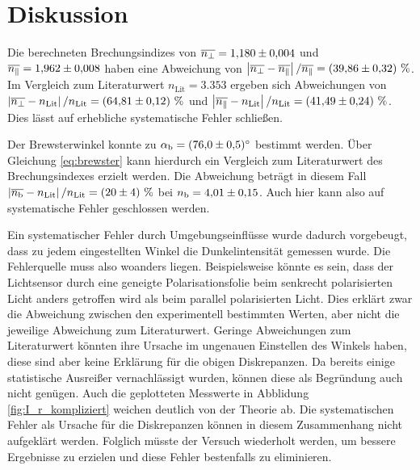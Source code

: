 \section{Diskussion}
Die berechneten Brechungsindizes von $\overline{n_\perp} = \num{1.180 \pm 0.004} $
und $\overline{n_\parallel} = \num{1.962 \pm 0.008}$ haben eine Abweichung von 
$\left|\overline{n_\perp} - \overline{n_\parallel}\right|/\overline{n_\parallel} = \left(\num{39.86 +- 0.32}\right) \, \%$.
Im Vergleich zum Literaturwert \cite{si_n} $n_\text{Lit} = \num{3.353}$ ergeben sich Abweichungen von
$\left|\overline{n_\perp} - n_\text{Lit}\right|/n_\text{Lit} = \left(\num{64.81 +- 0.12}\right) \, \%$
und $\left|\overline{n_\parallel} - n_\text{Lit}\right|/n_\text{Lit} = \left(\num{41.49+-0.24}\right) \, \%$.
Dies lässt auf erhebliche systematische Fehler schließen.

\noindent
Der Brewsterwinkel konnte zu $\alpha_\text{b} = \qty{76 \pm 0.5}{\degree}$ bestimmt werden.
Über Gleichung \eqref{eq:brewster} kann hierdurch ein Vergleich zum Literaturwert des Brechungsindexes erzielt werden.
Die Abweichung beträgt in diesem Fall
$\left|\overline{n_\text{b}} - n_\text{Lit}\right|/n_\text{Lit} = \left(\num{20+-4}\right) \, \%$
bei $n_\text{b} = \num{4.01 \pm 0.15}$.
Auch hier kann also auf systematische Fehler geschlossen werden.

\noindent
Ein systematischer Fehler durch Umgebungseinflüsse wurde dadurch vorgebeugt, dass zu jedem eingestellten Winkel die Dunkelintensität gemessen wurde.
Die Fehlerquelle muss also woanders liegen.
Beispielsweise könnte es sein, dass der Lichtsensor durch eine geneigte Polarisationsfolie beim senkrecht polarisierten Licht anders getroffen wird als beim parallel
polarisierten Licht. 
Dies erklärt zwar die Abweichung zwischen den experimentell bestimmten Werten, aber nicht die jeweilige Abweichung zum Literaturwert.
Geringe Abweichungen zum Literaturwert könnten ihre Ursache im ungenauen Einstellen des Winkels haben, diese sind aber keine Erklärung für die obigen Diskrepanzen.
Da bereits einige statistische Ausreißer vernachlässigt wurden, können diese als Begründung auch nicht genügen.
Auch die geplotteten Messwerte in Abblidung \ref{fig:I_r_kompliziert} weichen deutlich von der Theorie ab.
Die systematischen Fehler als Ursache für die Diskrepanzen können in diesem Zusammenhang nicht aufgeklärt werden. 
Folglich müsste der Versuch wiederholt werden, um bessere Ergebnisse zu erzielen und diese Fehler bestenfalls zu eliminieren.


